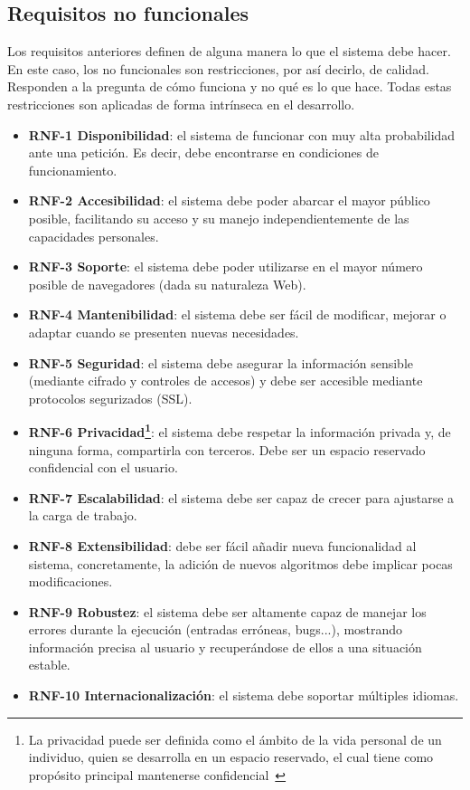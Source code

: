 \subsection{Requisitos no funcionales}
Los requisitos anteriores definen de alguna manera lo que el sistema debe hacer.
En este caso, los no funcionales son restricciones, por así decirlo, de calidad.
Responden a la pregunta de cómo funciona y no qué es lo que hace. Todas estas
restricciones son aplicadas de forma intrínseca en el desarrollo.

\begin{itemize}
	\item \textbf{RNF-1 Disponibilidad}: el sistema de funcionar con muy alta
	probabilidad ante una petición. Es decir, debe encontrarse en condiciones de
	funcionamiento.
	\item \textbf{RNF-2 Accesibilidad}: el sistema debe poder abarcar el mayor
	público posible, facilitando su acceso y su manejo independientemente de las
	capacidades personales.
    \item \textbf{RNF-3 Soporte}: el sistema debe poder utilizarse en el mayor
    número posible de navegadores (dada su naturaleza Web).
	\item \textbf{RNF-4 Mantenibilidad}: el sistema debe ser fácil de modificar,
	mejorar o adaptar cuando se presenten nuevas necesidades.
	\item \textbf{RNF-5 Seguridad}: el sistema debe asegurar la información
	sensible (mediante cifrado y controles de accesos) y debe ser accesible
	mediante protocolos segurizados (SSL).
	\item \textbf{RNF-6 Privacidad\footnote{La privacidad puede ser definida
	como el ámbito de la vida personal de un individuo, quien se desarrolla en
	un espacio reservado, el cual tiene como propósito principal mantenerse
	confidencial~\cite{eswiki:148719517}}}: el sistema debe respetar la
	información privada y, de ninguna forma, compartirla con terceros. Debe ser
	un espacio reservado confidencial con el usuario.
	\item \textbf{RNF-7 Escalabilidad}: el sistema debe ser capaz de crecer para
	ajustarse a la carga de trabajo.
	\item \textbf{RNF-8 Extensibilidad}: debe ser fácil añadir nueva
	funcionalidad al sistema, concretamente, la adición de nuevos algoritmos
	debe implicar pocas modificaciones.
	\item \textbf{RNF-9 Robustez}: el sistema debe ser altamente capaz de
	manejar los errores durante la ejecución (entradas erróneas, bugs...),
	mostrando información precisa al usuario y recuperándose de ellos a una
	situación estable.
	\item \textbf{RNF-10 Internacionalización}: el sistema debe soportar múltiples idiomas.

\end{itemize}


